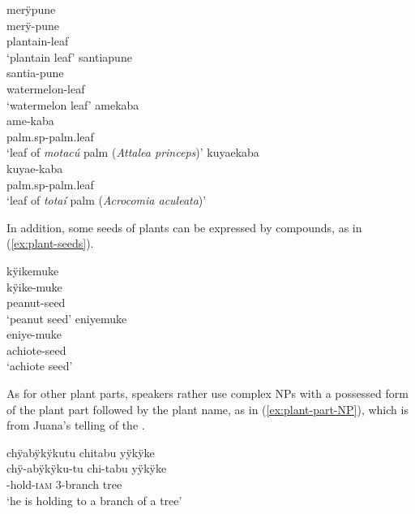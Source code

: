\ea\label{ex:plant-leaves}
  \ea\label{ex:plant-leaves.1}
\begingl
\glpreamble merÿpune\\
\gla merÿ-pune\\
\glb plantain-leaf\\
\glft ‘plantain leaf’
\endgl
  \ex\label{ex:plant-leaves.2}
\begingl
\glpreamble santiapune\\
\gla santia-pune\\
\glb watermelon-leaf\\
\glft ‘watermelon leaf’
\endgl
  \ex\label{ex:plant-leaves.3}
\begingl
\glpreamble amekaba\\
\gla ame-kaba\\
\glb palm.sp-palm.leaf\\
\glft ‘leaf of \textit{motacú} palm (\textit{Attalea princeps})’
\endgl
  \ex\label{ex:plant-leaves.4}
\begingl
\glpreamble kuyaekaba\\
\gla kuyae-kaba\\
\glb palm.sp-palm.leaf\\
\glft ‘leaf of \textit{totaí} palm (\textit{Acrocomia aculeata})’
\endgl
\z
\xe

In addition, some seeds of plants can be expressed by compounds, as in (\ref{ex:plant-seeds}).


\ea\label{ex:plant-seeds}
  \ea\label{ex:plant-seeds.1}
\begingl
\glpreamble kÿikemuke\\
\gla kÿike-muke\\
\glb peanut-seed\\
\glft ‘peanut seed’
\endgl
  \ex\label{ex:plant-seeds.2}
\begingl
\glpreamble eniyemuke\\
\gla eniye-muke\\
\glb achiote-seed\\
\glft ‘achiote seed’
\endgl
{}
\z
\xe


As for other plant parts, speakers rather use complex NPs with a possessed form of the plant part followed by the plant name, as in (\ref{ex:plant-part-NP}), which is from Juana’s telling of the .

\ea\label{ex:plant-part-NP}
\begingl
\glpreamble chÿabÿkÿkutu chitabu yÿkÿke\\
\gla chÿ-abÿkÿku-tu chi-tabu yÿkÿke\\
-hold-\textsc{iam} 3-branch tree\\
\glft ‘he is holding to a branch of a tree’
\endgl
\trailingcitation{[jxx-a120516l-a.162]}
\xe


